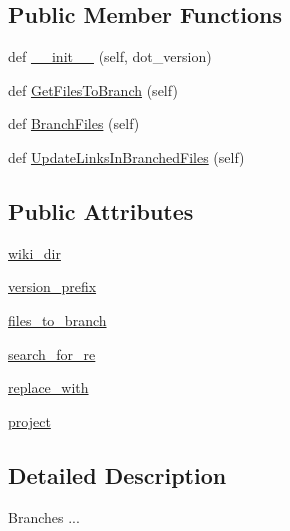 \subsection*{Public Member Functions}
\begin{DoxyCompactItemize}
\item 
def \hyperlink{classrelease__docs_1_1WikiBrancher_a344b32e2b65f0e8bab9fbf1e670d33fd}{\+\_\+\+\_\+init\+\_\+\+\_\+} (self, dot\+\_\+version)
\item 
def \hyperlink{classrelease__docs_1_1WikiBrancher_a05fc4282f501fb0210ecb33fd1d209a6}{Get\+Files\+To\+Branch} (self)
\item 
def \hyperlink{classrelease__docs_1_1WikiBrancher_a5ef284f7e1742f465ecd0c14d2667327}{Branch\+Files} (self)
\item 
def \hyperlink{classrelease__docs_1_1WikiBrancher_aa0bc4b1b78426fe7a8496d570b540f1d}{Update\+Links\+In\+Branched\+Files} (self)
\end{DoxyCompactItemize}
\subsection*{Public Attributes}
\begin{DoxyCompactItemize}
\item 
\hyperlink{classrelease__docs_1_1WikiBrancher_ad86478c9538ac0bf3916f67eb5da2910}{wiki\+\_\+dir}
\item 
\hyperlink{classrelease__docs_1_1WikiBrancher_aae330aeef850b105795c5d75727448ba}{version\+\_\+prefix}
\item 
\hyperlink{classrelease__docs_1_1WikiBrancher_a938c78ba6e8adfb6af039dd500ac6466}{files\+\_\+to\+\_\+branch}
\item 
\hyperlink{classrelease__docs_1_1WikiBrancher_a029ce9007fefd6ac5f13bacdedb29af5}{search\+\_\+for\+\_\+re}
\item 
\hyperlink{classrelease__docs_1_1WikiBrancher_aa33d991e629cc94fbfefe4f8569e283e}{replace\+\_\+with}
\item 
\hyperlink{classrelease__docs_1_1WikiBrancher_a4ac9c796f95690cca04049b557055443}{project}
\end{DoxyCompactItemize}


\subsection{Detailed Description}
\begin{DoxyVerb}Branches ...\end{DoxyVerb}
 

